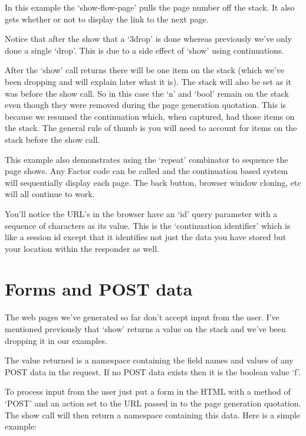 In this example the `show-flow-page' pulls the page number off the
stack. It also gets whether or not to display the link to the next
page.

Notice that after the show that a `3drop' is done whereas
previously we've only done a single `drop'. This is due to a side
effect of `show' using continuations. 

After the `show' call returns there will be one item on the stack
(which we've been dropping and will explain later what it is). The
stack will also be set as it was before the show call. So in this case
the `n' and `bool' remain on the stack even though they were removed
during the page generation quotation. This is because we resumed the
continuation which, when captured, had those items on the stack. The
general rule of thumb is you will need to account for items on the
stack before the show call.

This example also demonstrates using the `repeat' combinator to
sequence the page shows. Any Factor code can be called and the
continuation based system will sequentially display each page. The
back button, browser window cloning, etc will all continue to work.

You'll notice the URL's in the browser have an `id' query parameter
with a sequence of characters as its value. This is the `continuation
identifier' which is like a session id except that it identifies not
just the data you have stored but your location within the responder
as well.

\section{Forms and POST data}

The web pages we've generated so far don't accept input from the
user. I've mentioned previously that `show' returns a value on the
stack and we've been dropping it in our examples. 

The value returned is a namespace containing the field names and
values of any POST data in the request. If no POST data exists then it
is the boolean value `f'. 

To process input from the user just put a form in the HTML with a
method of `POST' and an action set to the URL passed in to the page
generation quotation. The show call will then return a namespace
containing this data. Here is a simple example:

